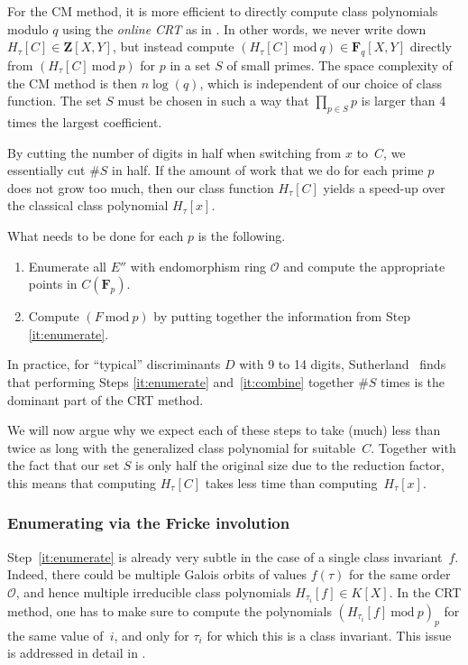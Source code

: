 \documentclass{amsart}
\newcommand{\ZZ}{\mathbf{Z}}
\newcommand{\FF}{\mathbf{F}}
\newcommand{\F}{H_\tau[\curve]}
\newcommand{\Fx}{H_\tau[x]}
\newcommand{\mc}{\mathcal}
\newcommand{\curve}{C}
\numberwithin{equation}{section}
\theoremstyle{definition}
\begin{document}
    For the CM method, it is more efficient to directly compute class polynomials
    modulo $q$ using
    the \emph{online CRT}
    as in \cite[Section~2]{sutherland2011crt}.
    In other words, we never write down $\F\in\ZZ[X,Y]$,
    but instead compute $(\F\ \mathrm{mod}\ q)\in\FF_q[X,Y]$
    directly
    from $(\F\ \mathrm{mod}\ p)$ for $p$ in a set $S$ of small primes.
    The space complexity of the CM method is then $n\log(q)$, which is independent
    of our choice of class function.
    The set $S$ must be chosen in such a way that $\prod_{p\in S} p$
    is larger than 4 times the largest coefficient.
    
    By cutting the number of digits
    in half when switching from $x$ to~$C$, we essentially cut $\# S$ in half.
    If the amount of work that we do for each prime $p$ does not grow too much,
    then our class function $\F$ yields a speed-up over the classical class polynomial $\Fx$.
    
    What needs to be done for each $p$ is the following.
    \begin{enumerate}
    	\item\label{it:enumerate} Enumerate all $E''$ with endomorphism ring $\mathcal{O}$
    	and compute the appropriate points in $C(\FF_p)$.
    	\item\label{it:combine} Compute $(F\ \mathrm{mod}\ p)$ by putting together the information
    	from Step \ref{it:enumerate}.
    \end{enumerate}
    In practice, for ``typical'' discriminants $D$ with 9 to 14 digits,
    Sutherland~\cite[Sections 8.3 and~8.4]{sutherland2011crt}
    finds that performing Steps \ref{it:enumerate} and~\ref{it:combine} together $\#S$ times 
    is the dominant part of the CRT method.
    
    We will now argue why we expect each of these steps to take
    (much) less than twice as long 
    with the generalized class polynomial for suitable~$C$.
    Together with the fact that our set $S$ is only half the original size
    due to the reduction factor,
    this means that computing $\F$ takes less
    time than computing~$\Fx$.
    
    \subsubsection{Enumerating via the Fricke involution}
    
    Step~\ref{it:enumerate} is already very subtle in the case of a single class invariant~$f$.
    Indeed, there could be
    multiple Galois orbits of values $f(\tau)$ for the same order~$\mc{O}$,
    and hence multiple irreducible class polynomials $H_{\tau_i}[f]\in K[X]$.
    In the CRT method, one has to make sure to compute the polynomials
    $(H_{\tau_i}[f]\ \mathrm{mod}\ p)_p$ for the same value of~$i$,
    and only for $\tau_i$ for which this is a class invariant.
    This issue is addressed in detail in \cite[Section~4]{enge-sutherland2010}.
    
\end{document}
